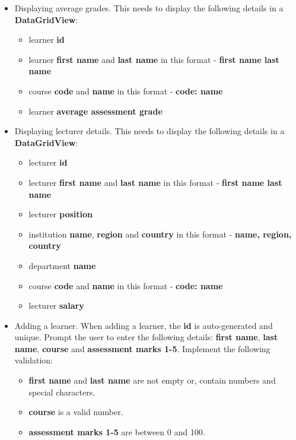 \documentclass{article}
\begin{document}
\begin{itemize}
\begin{itemize}
\begin{itemize}
            \item Displaying average grades. This needs to display the following details in a \textbf{DataGridView}:
            \begin{itemize}
                \item learner \textbf{id}
                \item learner \textbf{first name} and \textbf{last name} in this format - \textbf{first name last name}
                \item course \textbf{code} and \textbf{name} in this format - \textbf{code: name}
                \item learner \textbf{average assessment grade}
            \end{itemize}
            \item Displaying lecturer details. This needs to display the following details in a \textbf{DataGridView}:
            \begin{itemize}
                \item lecturer \textbf{id}
                \item lecturer \textbf{first name} and \textbf{last name} in this format - \textbf{first name last name}
                \item lecturer \textbf{position}
                \item institution \textbf{name}, \textbf{region} and \textbf{country} in this format - \textbf{name, region, country}
                \item department \textbf{name}
                \item course \textbf{code} and \textbf{name} in this format - \textbf{code: name}
                \item lecturer \textbf{salary}
            \end{itemize}
            \item Adding a learner. When adding a learner, the \textbf{id} is auto-generated and unique. Prompt the user to enter the following details: \textbf{first name}, \textbf{last name}, \textbf{course} and \textbf{assessment marks 1-5}. Implement the following validation:
            \begin{itemize}
                \item \textbf{first name} and \textbf{last name} are not empty or, contain numbers and special characters.
                \item \textbf{course} is a valid number.
                \item \textbf{assessment marks 1-5} are between 0 and 100.

\end{itemize}
\end{itemize}
\end{itemize}
\end{itemize}
\end{document}
